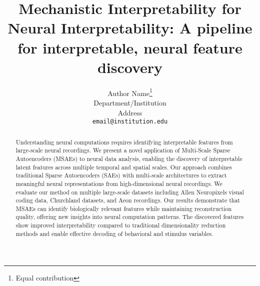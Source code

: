 \documentclass{article}
\title{
  Mechanistic Interpretability for Neural Interpretability: 
  A pipeline for interpretable, neural feature discovery
}
\author{%
  Author Name\thanks{Equal contribution} \\
  Department/Institution \\
  Address \\
  \texttt{email@institution.edu} \\
}
\begin{document}
\maketitle

\begin{abstract}
Understanding neural computations requires identifying interpretable features from large-scale neural recordings. We present a novel application of Multi-Scale Sparse Autoencoders (MSAEs) to neural data analysis, enabling the discovery of interpretable latent features across multiple temporal and spatial scales. Our approach combines traditional Sparse Autoencoders (SAEs) with multi-scale architectures to extract meaningful neural representations from high-dimensional neural recordings. We evaluate our method on multiple large-scale datasets including Allen Neuropixels visual coding data, Churchland datasets, and Aeon recordings. Our results demonstrate that MSAEs can identify biologically relevant features while maintaining reconstruction quality, offering new insights into neural computation patterns. The discovered features show improved interpretability compared to traditional dimensionality reduction methods and enable effective decoding of behavioral and stimulus variables.
\end{abstract}








\end{document}
